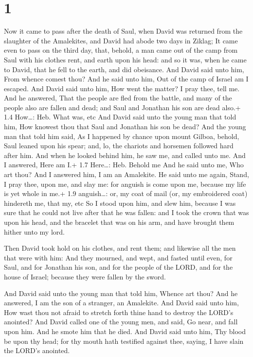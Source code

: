 \hypertarget{section}{%
\section{1}\label{section}}

 Now it came to pass after the death of Saul, when David was
returned from the slaughter of the Amalekites, and David had abode two
days in Ziklag;  It came even to pass on the third day,
that, behold, a man came out of the camp from Saul with his clothes
rent, and earth upon his head: and so it was, when he came to David,
that he fell to the earth, and did obeisance.  And David
said unto him, From whence comest thou? And he said unto him, Out of the
camp of Israel am I escaped.  And David said unto him, How
went the matter? I pray thee, tell me. And he answered, That the people
are fled from the battle, and many of the people also are fallen and
dead; and Saul and Jonathan his son are dead also.+ 1.4 How\ldots: Heb.
What was, etc  And David said unto the young man that told
him, How knowest thou that Saul and Jonathan his son be dead?
 And the young man that told him said, As I happened by
chance upon mount Gilboa, behold, Saul leaned upon his spear; and, lo,
the chariots and horsemen followed hard after him.  And when
he looked behind him, he saw me, and called unto me. And I answered,
Here am I.+ 1.7 Here\ldots: Heb. Behold me  And he said unto
me, Who art thou? And I answered him, I am an Amalekite.  He
said unto me again, Stand, I pray thee, upon me, and slay me: for
anguish is come upon me, because my life is yet whole in me.+ 1.9
anguish\ldots: or, my coat of mail (or, my embroidered coat) hindereth
me, that my, etc  So I stood upon him, and slew him,
because I was sure that he could not live after that he was fallen: and
I took the crown that was upon his head, and the bracelet that was on
his arm, and have brought them hither unto my lord.

 Then David took hold on his clothes, and rent them; and
likewise all the men that were with him:  And they mourned,
and wept, and fasted until even, for Saul, and for Jonathan his son, and
for the people of the LORD, and for the house of Israel; because they
were fallen by the sword.

 And David said unto the young man that told him, Whence
art thou? And he answered, I am the son of a stranger, an Amalekite.
 And David said unto him, How wast thou not afraid to
stretch forth thine hand to destroy the LORD's anointed? 
And David called one of the young men, and said, Go near, and fall upon
him. And he smote him that he died.  And David said unto
him, Thy blood be upon thy head; for thy mouth hath testified against
thee, saying, I have slain the LORD's anointed.

